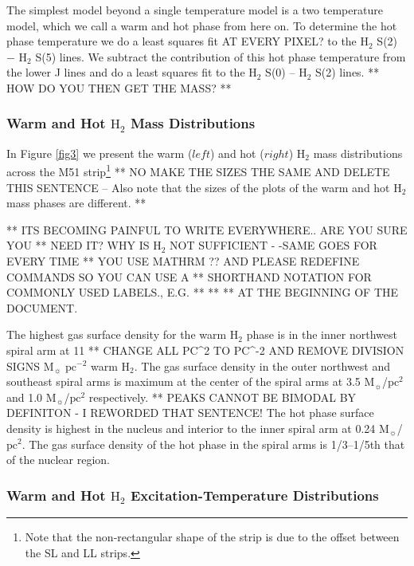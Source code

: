 \documentclass[manuscript]{aastex}
\begin{document}
The simplest model beyond a single temperature model is a two
temperature model, which we call a warm and hot phase from here on.
To determine the hot phase temperature we do a least squares fit AT
EVERY PIXEL? to the $\mathrm{H_2}$ S(2) $-$ $\mathrm{H_2}$ S(5) lines.
We subtract the contribution of this hot phase temperature from the
lower J lines and do a least squares fit to the $\mathrm{H_2}$ S(0) --
$\mathrm{H_2}$ S(2) lines.  ** HOW DO YOU THEN GET THE MASS? **

\subsubsection{Warm and Hot $\mathrm{H_2}$ Mass Distributions}

In Figure \ref{fig3} we present the warm ($left$) and hot ($right$)
$\mathrm{H_2}$ mass distributions across the M51 strip\footnote{Note
  that the non-rectangular shape of the strip is due to the offset
  between the SL and LL strips.}  ** NO MAKE THE SIZES THE SAME AND
DELETE THIS SENTENCE -- Also note that the sizes of the plots of the
warm and hot $\mathrm{H_2}$ mass phases are different.  ** 

** ITS BECOMING PAINFUL TO WRITE \MATHRM EVERYWHERE.. ARE YOU SURE YOU
** NEED IT?  WHY IS H$_2$ NOT SUFFICIENT - -SAME GOES FOR EVERY TIME
** YOU USE MATHRM ?? AND PLEASE REDEFINE COMMANDS SO YOU CAN USE A
** SHORTHAND NOTATION FOR COMMONLY USED LABELS., E.G. 
** \newcommand{\kms}{km\ s$^{-1}$}  
** \newcommand{\vsys}{v_{\rm sys}}
** AT THE BEGINNING OF THE DOCUMENT. 

The highest gas surface density for the warm $\mathrm{H_2}$ phase is
in the inner northwest spiral arm at 11
** CHANGE ALL PC^2 TO PC^{-2} AND REMOVE DIVISION SIGNS
$\mathrm{M_\sun}$ $\mathrm{pc^{-2}}$ warm $\mathrm{H_2}$. The gas surface
density in the outer northwest and southeast spiral arms is maximum at
the center of the spiral arms at 3.5 $\mathrm{M_\sun}$/$\mathrm{pc^2}$
and 1.0 $\mathrm{M_\sun}$/$\mathrm{pc^2}$ respectively.
** PEAKS CANNOT BE BIMODAL BY DEFINITON - I REWORDED THAT SENTENCE!
The hot phase surface density is highest in the nucleus and interior
to the inner spiral arm at 0.24 $\mathrm{M_\sun}$/$\mathrm{pc^2}$.
The gas surface density of the hot phase in the spiral arms is
1/3--1/5th that of the nuclear region.

\subsubsection{Warm and Hot $\mathrm{H_2}$ Excitation-Temperature Distributions}
\end{document}
